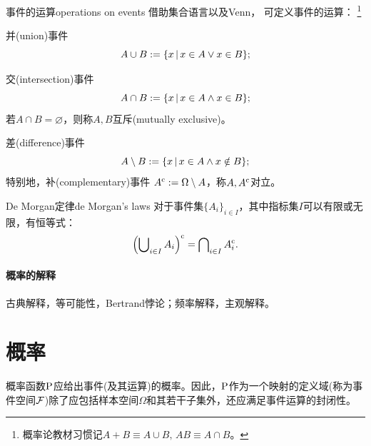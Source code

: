 \begin{definition}
	{事件的运算}{operations on events}
	借助集合语言以及Venn，
	可定义事件的运算：
	\footnote{概率论教材习惯记$A + B \equiv A \cup B,\,AB \equiv A \cap B$。}
	\begin{compactitem}
		\item 并(union)事件
		\begin{equation}
			A \cup B := \set x{x \in A \lor x \in B};
		\end{equation}
		\item 交(intersection)事件
		\begin{equation}
			A \cap B := \set x{x \in A \land x \in B};
		\end{equation}
		若$A \cap B = \varnothing$，则称$A,B$互斥(mutually exclusive)。
		\item 差(difference)事件
		\begin{equation}
			A \setminus B := \set x{x \in A \land x \notin B};
		\end{equation}
		特别地，补(complementary)事件 $A\eventcomp := \Omega \setminus A$，称$A,A\eventcomp$对立。
	\end{compactitem}
	\begin{notecaptionblock}
		\label{fig:venn}
	\end{notecaptionblock}
\end{definition}

\begin{theorem}
	{De Morgan定律}{de Morgan's laws}
	对于事件集$\{A_i\}_{i\in I}$，其中指标集$I$可以有限或无限，有恒等式：
	\begin{equation}\label{eq:ps-de-morgan}
		\Bigp{\bigcup\nolimits_{i\in I} A_i}\eventcomp = \bigcap\nolimits_{i\in I} A_i\eventcomp.
	\end{equation}
\end{theorem}

\paragraph{概率的解释}古典解释，等可能性，Bertrand悖论；频率解释，主观解释。

\section{概率}
\label{sec:probability}

概率函数$\P$应给出事件(及其运算)的概率。因此，$\P$作为一个映射的定义域(称为事件空间$\eventspace$)除了应包括样本空间$\Omega$和其若干子集外，还应满足事件运算的封闭性。


